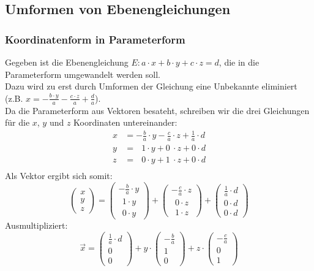 \documentclass[a4paper,12pt]{article}
\begin{document}
\subsection{Umformen von Ebenengleichungen}
\subsubsection{Koordinatenform in Parameterform}
Gegeben ist die Ebenengleichung $E : a \cdot x + b \cdot y + c \cdot z = d$, die in die Parameterform umgewandelt werden soll.\\
Dazu wird zu erst durch Umformen der Gleichung eine Unbekannte eliminiert (z.B. $x = -\frac{b \cdot y}{a} - \frac{c \cdot z}{a} + \frac{d}{a}$).\\
Da die Parameterform aus Vektoren besateht, schreiben wir die drei Gleichungen für die $x$, $y$ und $z$ Koordinaten untereinander:\\
\begin{equation*}
\begin{split}
x & = -\frac{b}{a} \cdot y - \frac{c}{a} \cdot z + \frac{1}{a} \cdot d\\
y & = \ \ \ 1 \cdot y + 0\ \cdot z + 0 \cdot d\\
z & = \ \ \ 0 \cdot y + 1\ \cdot z + 0 \cdot d\\
\end{split}
\end{equation*}
Als Vektor ergibt sich somit:
$$\begin{pmatrix}x\\y\\z\end{pmatrix} = \begin{pmatrix}-\frac{b}{a} \cdot y\\\ \ 1 \cdot y\\\ \ 0 \cdot y\end{pmatrix} + \begin{pmatrix}- \frac{c}{a}\cdot z\\\ \ 0 \cdot z\\\ \ 1 \cdot z\end{pmatrix} + \begin{pmatrix}\frac{1}{a} \cdot d\\0 \cdot d\\0 \cdot d\end{pmatrix}$$
Ausmultipliziert:
$$\vec{x} = \begin{pmatrix}\frac{1}{a} \cdot d\\0\\0\end{pmatrix} + y \cdot \begin{pmatrix}-\frac{b}{a}\\1\\0\end{pmatrix} + z \cdot \begin{pmatrix}- \frac{c}{a}\\0\\1\end{pmatrix}$$ 
\pagebreak
\end{document}
